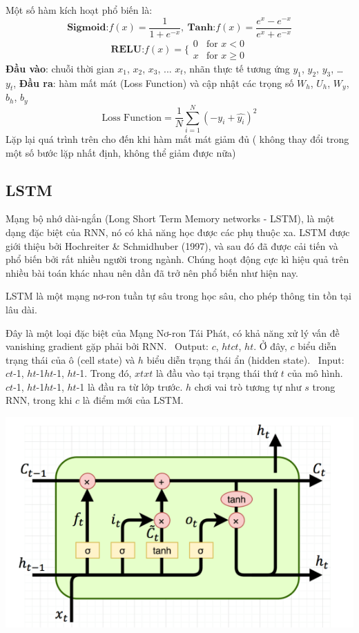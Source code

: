 Một số hàm kích hoạt phổ biến là:
\[\textbf{Sigmoid:} f(x)=\frac{1}{1+e^{-x}}, 
\ \textbf{Tanh:} f(x) = \frac{e^x - e^{-x}}{e^x + e^{-x}}\]
\[\textbf{RELU:} f(x)=\{\begin{matrix}
0 & \text{for } x<0 \\
x & \text{for } x\ge0
\end{matrix}\]
\textbf{Đầu vào}: chuỗi thời gian \(x_1\), \(x_2\), \(x_3\), ... \(x_t\), nhãn thực tế tương ứng \(y_1\), \(y_2\), \(y_3\), … \(y_t\),
\textbf{Đầu ra}: hàm mất mát (Loss Function) và cập nhật các trọng số \(W_h\), \(U_h\), \(W_y\), \(b_h\), \(b_y\)
\[\text{Loss Function} = \frac{1}{N} \sum_{i=1}^{N} (-y_i + \hat{y_i})^2\]
Lặp lại quá trình trên cho đến khi hàm mất mát giảm đủ ( không thay đổi trong một số bước lặp nhất định, không thể giảm được nữa)
\subsection{LSTM}
Mạng bộ nhớ dài-ngắn (Long Short Term Memory networks - LSTM), là một dạng đặc biệt của RNN, nó có khả năng học được các phụ thuộc xa. LSTM được giới thiệu bởi Hochreiter \& Schmidhuber (1997), và sau đó đã được cải tiến và phổ biến bởi rất nhiều người trong ngành. Chúng hoạt động cực kì hiệu quả trên nhiều bài toán khác nhau nên dần đã trở nên phổ biến như hiện nay.
\par
LSTM là một mạng nơ-ron tuần tự sâu trong học sâu, cho phép thông tin tồn tại lâu dài.
\par
Đây là một loại đặc biệt của Mạng Nơ-ron Tái Phát, có khả năng xử lý vấn đề vanishing gradient gặp phải bởi RNN.
    \indent\textbullet\ Output: \(c\), \(htct\), \(ht\). Ở đây, \(c\) biểu diễn trạng thái của ô (cell state) và \(h\) biểu diễn trạng thái ẩn (hidden state).
    \indent\textbullet\ Input: \(ct\)-1, \(ht\)-1\(ht\)-1, \(ht\)-1. Trong đó, \(xtxt\) là đầu vào tại trạng thái thứ \(t\) của mô hình. \(ct\)-1, \(ht\)-1\(ht\)-1, \(ht\)-1 là đầu ra từ lớp trước. \(h\) chơi vai trò tương tự như \(s\) trong RNN, trong khi \(c\) là điểm mới của LSTM.

\begin{minipage}{0.5\textwidth}
\centering
\includegraphics[width=1\textwidth]{resources/chapter-4/lstm-1.png}
\end{minipage}

